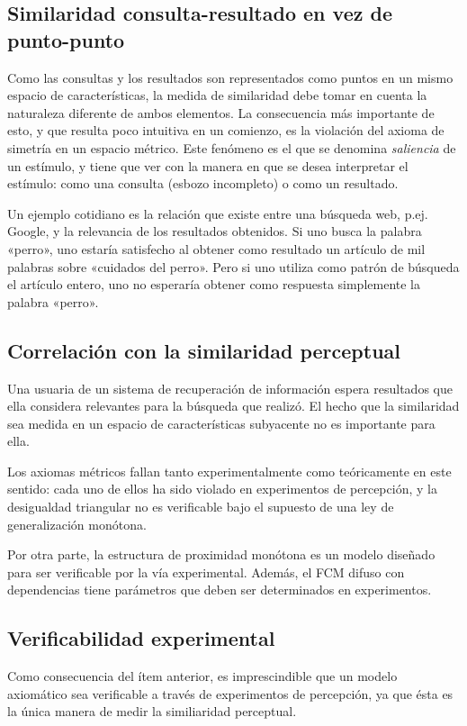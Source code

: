 \documentclass[spanish]{article}
\begin{document}
\subsection{Similaridad consulta-resultado en vez de punto-punto}
Como las consultas y los resultados son representados como puntos en un
mismo espacio de características, la medida de similaridad debe tomar en cuenta
la naturaleza diferente de ambos elementos.  La consecuencia más importante de
esto, y que resulta poco intuitiva en un comienzo, es la violación del axioma de
simetría en un espacio métrico.  Este fenómeno es el que se denomina
\emph{saliencia} de un estímulo, y tiene que ver con la manera en que se desea
interpretar el estímulo: como una consulta (esbozo incompleto) o como un resultado.

Un ejemplo cotidiano es la relación que existe entre una búsqueda web, p.ej.
Google, y la relevancia de los resultados obtenidos.  Si uno busca la palabra
«perro», uno estaría satisfecho al obtener como resultado un artículo de mil
palabras sobre «cuidados del perro».  Pero si uno utiliza como patrón de
búsqueda el artículo entero, uno no esperaría obtener como respuesta simplemente
la palabra «perro».

\subsection{Correlación con la similaridad perceptual}
Una usuaria de un sistema de recuperación de información espera resultados
que ella considera relevantes para la búsqueda que realizó.  El hecho que la
similaridad sea medida en un espacio de características subyacente no es
importante para ella.

Los axiomas métricos fallan tanto experimentalmente como teóricamente en este
sentido:  cada uno de ellos ha sido violado en experimentos de percepción, y la
desigualdad triangular no es verificable bajo el supuesto de una ley de
generalización monótona.

Por otra parte, la estructura de proximidad monótona es un modelo diseñado para
ser verificable por la vía experimental.  Además, el FCM difuso con dependencias
tiene parámetros que deben ser determinados en experimentos.

\subsection{Verificabilidad experimental}
Como consecuencia del ítem anterior, es imprescindible que un modelo axiomático
sea verificable a través de experimentos de percepción, ya que ésta es la única
manera de medir la similiaridad perceptual.
\end{document}

